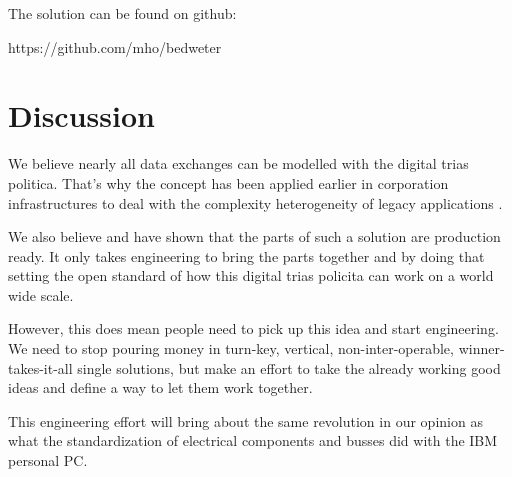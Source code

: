 \documentclass{article}
\begin{document}
The solution can be found on github: \SetWatermarkText{}

https://github.com/mho/bedweter

\section{Discussion}
We believe nearly all data exchanges can be modelled with the digital trias politica. That's why the concept has been applied earlier in corporation infrastructures to deal with the complexity heterogeneity of legacy applications \cite{harnik2011secure}. 

We also believe and have shown that the parts of such a solution are production ready. It only takes engineering to bring the parts together and by doing that setting the open standard of how this digital trias policita can work on a world wide scale. 

However, this does mean people need to pick up this idea and start engineering. We need to stop pouring money in turn-key, vertical, non-inter-operable, winner-takes-it-all single solutions, but make an effort to take the already working good ideas and define a way to let them work together. 

This engineering effort will bring about the same revolution in our opinion as what the standardization of electrical components and busses did with the IBM personal PC.



\end{document}
